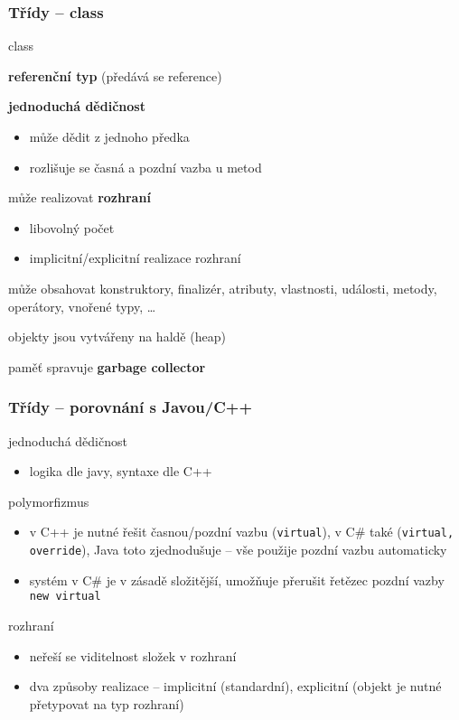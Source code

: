 
\begin{frame}[fragile]
\frametitle{Třídy -- class}
\begin{bitemize}{class}
\item \textbf{referenční typ} (předává se reference)
\item \textbf{jednoduchá dědičnost}
\begin{itemize}
\item může dědit z jednoho předka
\item rozlišuje se časná a pozdní vazba u metod
\end{itemize}
\item může realizovat \textbf{rozhraní}
\begin{itemize}
\item libovolný počet
\item implicitní/explicitní realizace rozhraní
\end{itemize}
\item může obsahovat konstruktory, finalizér, atributy, vlastnosti, události, metody, operátory, vnořené typy, \ldots
\item objekty jsou vytvářeny na haldě (heap)
\item paměť spravuje \textbf{garbage collector}
\end{bitemize}
\end{frame}



\begin{frame}[fragile]
\frametitle{Třídy -- porovnání s Javou/C++}
\begin{bitemize}{}
\item jednoduchá dědičnost
\begin{itemize}
\item logika dle javy, syntaxe dle C++
\end{itemize}
\item polymorfizmus
\begin{itemize}
\item v C++ je nutné řešit časnou/pozdní vazbu (\lstinline|virtual|), v C\# také (\lstinline|virtual, override|), Java toto zjednodušuje -- vše použije pozdní vazbu automaticky
\item systém v C\# je v zásadě složitější, umožňuje přerušit řetězec pozdní vazby \lstinline|new virtual|
\end{itemize}
\item rozhraní
\begin{itemize}
\item neřeší se viditelnost složek v rozhraní
\item dva způsoby realizace -- implicitní (standardní), explicitní (objekt je nutné přetypovat na typ rozhraní)
\end{itemize}
\end{bitemize}
\end{frame}



